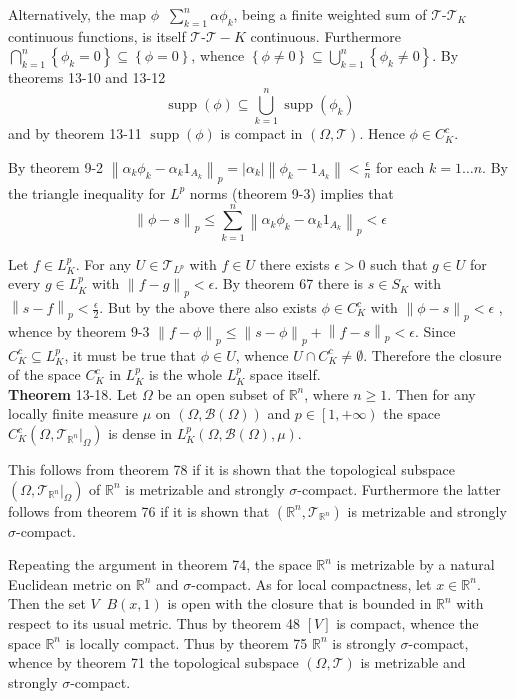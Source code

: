 \documentclass[a4paper]{article}
\newcommand{\obj}[1]{\left\{ #1 \right \}}
\newcommand{\clo}[1]{\left [ #1 \right ]}
\newcommand{\clop}[1]{\left [ #1 \right )}
\newcommand{\brac}[1]{\left ( #1 \right )}
\newcommand{\induc}[1]{\left . #1 \right \vert}
\newcommand{\abs}[1]{\left | #1 \right |}
\newcommand{\nrm}[1]{\left\| #1 \right \|}
\newcommand{\Real}{\mathbb{R}}
\newcommand{\Tcal}{\mathcal{T}}
\newcommand{\borel}[1]{\mathcal{B}\brac{#1}}
\newcommand{\Supp}[1]{\operatorname{supp}\nolimits\brac{#1}}
\newcommand{\defn}{\mathop{\overset{\Delta}{=}}\nolimits}
\begin{document}
Alternatively, the map $\phi\defn \sum_{k=1}^n \alpha \phi_k$, being a finite weighted sum of $\Tcal$-$\Tcal_K$ continuous functions, is itself $\Tcal$-$\Tcal-K$ continuous. Furthermore $\bigcap_{k=1}^n\obj{\phi_k=0}\subseteq \obj{\phi=0}$, whence $\obj{\phi\neq0}\subseteq \bigcup_{k=1}^n \obj{\phi_k\neq 0}$. By theorems 13-10 and 13-12 \[\Supp{\phi}\subseteq \bigcup_{k=1}^n \Supp{\phi_k}\] and by theorem 13-11 $\Supp{\phi}$ is compact in $\brac{\Omega,\Tcal}$. Hence $\phi\in C^c_K$.

By theorem 9-2 $\nrm{\alpha_k \phi_k - \alpha_k 1_{A_k}}_p = \abs{\alpha_k}\nrm{\phi_k-1_{A_k}}<\frac{\epsilon}{n}$ for each $k=1\ldots n$. By the triangle inequality for $L^p$ norms (theorem 9-3) implies that \[\nrm{\phi - s}_p\leq \sum_{k=1}^n \nrm{\alpha_k \phi_k - \alpha_k 1_{A_k}}_p < \epsilon\]

Let $f\in L^p_K$. For any $U\in \Tcal_{L^p}$ with $f\in U$ there exists $\epsilon>0$ such that $g\in U$ for every $g\in L^p_K$ with $\nrm{f-g}_p<\epsilon$. By theorem 67 there is $s\in S_K$ with $\nrm{s-f}_p<\frac{\epsilon}{2}$. But by the above there also exists $\phi\in C^c_K$ with $\nrm{\phi-s}_p<\epsilon$ , whence by theorem 9-3 $\nrm{f-\phi}_p\leq \nrm{s-\phi}_p+\nrm{f-s}_p<\epsilon$. Since $C^c_K\subseteq L^p_K$, it must be true that $\phi\in U$, whence $U\cap C^c_K \neq \emptyset$. Therefore the closure of the space $C^c_K$ in $L^p_K$ is the whole $L^p_K$ space itself.\\

\label{thm:rn_compact_support_dense} \noindent\textbf{Theorem} 13-18.
Let $\Omega$ be an open subset of $\Real^n$, where $n\geq1$. Then for any locally finite measure $\mu$ on $\brac{\Omega,\borel{\Omega}}$ and $p\in \clop{1,+\infty}$ the space $C^c_K\brac{\Omega,\induc{\Tcal_{\Real^n}}_\Omega}$ is dense in $L^p_K\brac{\Omega,\borel{\Omega},\mu}$.

This follows from theorem 78 if it is shown that the topological subspace $\brac{\Omega,\induc{\Tcal_{\Real^n}}_\Omega}$ of $\Real^n$ is metrizable and strongly $\sigma$-compact. Furthermore the latter follows from theorem 76 if it is shown that $\brac{\Real^n,\Tcal_{\Real^n}}$ is metrizable and strongly $\sigma$-compact.

Repeating the argument in theorem 74, the space $\Real^n$ is metrizable by a natural Euclidean metric on $\Real^n$ and $\sigma$-compact. As for local compactness, let $x\in \Real^n$. Then the set $V\defn B\brac{x, 1}$ is open with the closure that is bounded in $\Real^n$ with respect to its usual metric. Thus by theorem 48 $\clo{V}$ is compact, whence the space $\Real^n$ is locally compact. Thus by theorem 75 $\Real^n$ is strongly $\sigma$-compact, whence by theorem 71 the topological subspace $\brac{\Omega, \Tcal}$ is metrizable and strongly $\sigma$-compact.\\
\end{document}
